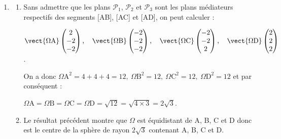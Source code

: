 \begin{enumerate}[resume]
\item
	\begin{enumerate}
		\item %
Sans admettre que les plans $\mathcal{P}_1$,\: $\mathcal{P}_2$ et $\mathcal{P}_3$ sont les plans médiateurs respectifs des segments [AB], [AC] et [AD], on peut calculer :

$\vect{\Omega \text{A}}\begin{pmatrix}2\\-2\\-2\end{pmatrix},\quad \vect{\Omega \text{B}}\begin{pmatrix}-2\\-2\\-2\end{pmatrix}, \quad \vect{\Omega \text{C}}\begin{pmatrix}-2\\-2\\2\end{pmatrix},\quad \vect{\Omega \text{D}}\begin{pmatrix}2\\2\\2\end{pmatrix}$.

On a donc $\Omega\text{A}^2 = 4 + 4 + 4 = 12, \: \Omega\text{B}^2 = 12,\: \Omega\text{C}^2 = 12, \: \Omega\text{D}^2 = 12$ et par conséquent :

$\Omega\text{A} = \Omega\text{B} = \Omega\text{C} = \Omega\text{D} = \sqrt{12} = \sqrt{4 \times 3} = 2\sqrt{3}$.
		\item %

Le résultat précédent montre que $\Omega$ est équidistant de A, B, C et D donc est le centre de la sphère de rayon $2\sqrt{3}$ contenant A, B, C et D.
	\end{enumerate}
\end{enumerate}
